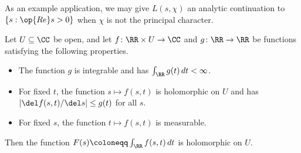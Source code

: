 \documentclass[../notes.tex]{subfiles}
\begin{document}
As an example application, we may give $L(s,\chi)$ an analytic continuation to $\{s:\op{Re}s>0\}$ when $\chi$ is not the principal character.
\begin{lemma} \label{lem:diff-under-sign}
	Let $U\subseteq\CC$ be open, and let $f\colon\RR\times U\to\CC$ and $g\colon\RR\to\RR$ be functions satisfying the following properties.
	\begin{itemize}
		\item The function $g$ is integrable and has $\int_\RR g(t)\,dt<\infty$.
		\item For fixed $t$, the function $s\mapsto f(s,t)$ is holomorphic on $U$ and has $|\del f(s,t)/\del s|\le g(t)$ for all $s$.
		\item For fixed $s$, the function $t\mapsto f(s,t)$ is measurable.
	\end{itemize}
	Then the function $F(s)\coloneqq\int_\RR f(s,t)\,dt$ is holomorphic on $U$.
\end{lemma}
\end{document}
